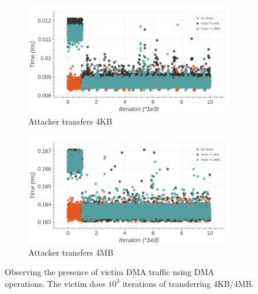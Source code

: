 \begin{figure}
     \centering
     
     \begin{subfigure}[b]{0.8\textwidth}
        \centering
        \includegraphics[width=\textwidth]{figures/interconnect-sc/dma/dma_contention_4KB.png}
        \caption{Attacker transfers 4KB}
        \label{fig:dma-contention-4kb}
     \end{subfigure}
     
     \hfill
     
     \begin{subfigure}[b]{0.8\textwidth}
         \centering
        \includegraphics[width=\textwidth]{figures/interconnect-sc/dma/dma_contention_4MB.png}
        \caption{Attacker transfers 4MB}
        \label{fig:dma-contention-4mb}
     \end{subfigure}
     
    \caption{Observing the presence of victim DMA traffic using DMA operations. The victim does $10^3$ iterations of transferring 4KB/4MB.}
    \label{fig:dma-contention}
\end{figure}
